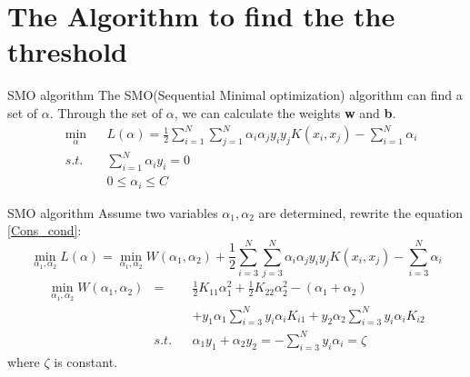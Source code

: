 \documentclass[10pt]{beamer}
\begin{document}
\section{The Algorithm to find the the threshold}


\begin{frame}{SMO algorithm}
The SMO(Sequential Minimal optimization) algorithm can find a set of $\alpha$.
Through the set of $ \alpha $, we can calculate the weights \textbf{w} and \textbf{b}.
\begin{equation}
    \begin{aligned}
   & \underset{\alpha}{\min}&&L(\alpha)=\frac{1}{2}\sum_{i=1}^{N}\sum_{j=1}^{N}
    \alpha_i\alpha_jy_iy_jK(x_i,x_j)-\sum_{i=1}^{N}\alpha_i \\
   & s.t. &&\sum_{i=1}^{N}\alpha_iy_i=0 \\
   & && 0 \leq\alpha_i\leq C 
    \end{aligned}
    \label{Cons_cond}
\end{equation}
\end{frame}
\begin{frame}{SMO algorithm}
Assume two variables $\alpha_1,\alpha_2$ are determined, rewrite the equation \ref{Cons_cond}:
\begin{equation}
    \underset{\alpha_1,\alpha_2}{\min}  L(\alpha)= \underset{\alpha_1,\alpha_2}{\min}W(\alpha_1,\alpha_2)
    +\frac{1}{2}\sum_{i=3}^{N}\sum_{j=3}^{N}\alpha_i\alpha_jy_iy_jK(x_i,x_j)-\sum_{i=3}^{N}\alpha_i
\end{equation}
\begin{equation}
    \begin{aligned}
    \underset{\alpha_1,\alpha_2}{\min}W(\alpha_1,\alpha_2)
   &=&&\frac{1}{2}K_{11}\alpha_1^2+\frac{1}{2}K_{22}\alpha_2^2-(\alpha_1+\alpha_2) \\
   & &&+y_1\alpha_1\sum_{i=3}^{N}y_i\alpha_iK_{i1}+y_2\alpha_2\sum_{i=3}^Ny_i\alpha_iK_{i2} \\
   &s.t.&&\alpha_1y_1+\alpha_2y_2 = -\sum_{i=3}^Ny_i\alpha_i = \zeta
    \end{aligned}
    \label{SMO_cond}
\end{equation}
where $\zeta$ is constant.
\end{frame}
\end{document}
